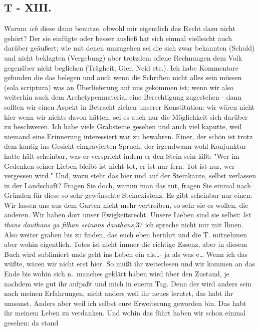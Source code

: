 \documentclass[
]{article}
\author{}
\date{\vspace{-2.5em}}
\begin{document}
\subsection{T - XIII.}\label{t---xiii.}

Warum \emph{ich} diese dann benutze, obwohl mir eigentlich das Recht
dazu nicht gehört? Der sie einfügte oder besser ausließ hat sich einmal
vielleicht auch darüber geäußert; wie mit denen umzugehen sei die sich
zwar bekannten (Schuld) und nicht beklagten (Vergebung) aber trotzdem
offene Rechnungen dem Volk gegenüber nicht beglichen (Trägheit, Gier,
Neid etc.). Ich habe Kommentare gefunden die das belegen und auch wenn
die Schriften nicht alles sein müssen (sola scriptura) was an
Überlieferung auf uns gekommen ist; wenn wir also weiterhin auch dem
Archetypenmaterial eine Berechtigung zugestehen - dann sollten wir einen
Aspekt in Betracht ziehen unserer Konstitution: wir wären nicht hier
wenn wir nichts davon hätten, sei es auch nur die Möglichkeit sich
darüber zu beschweren. Ich habe viele Grabsteine gesehen und auch viel
kaputte, weil niemand eine Erinnerung interessiert war zu bewahren.
Einer, der schön ist trotz dem kantig ins Gesicht eingravierten Spruch,
der irgendwann wohl Konjunktur hatte hält scheinbar, was er verspricht
indem er den Stein sein läßt: "Wer im Gedenken seiner Lieben bleibt ist
nicht tot, er ist nur fern. Tot ist nur, wer vergessen wird." Und, wozu
steht das hier und auf der Steinkante, selbst verlassen in der
Landschaft? Fragen Sie doch, warum man das tut, fragen Sie einmal nach
Gründen für diese so sehr gewünschte Steinexistenz. Es gibt scheinbar
nur einen: Wir lassen uns aus dem Garten nicht mehr vertreiben, so sehr
sie es wollen, die anderen. Wir haben dort unser Ewigkeitsrecht. Unsere
Lieben sind sie selbst: \emph{let thans dauthans ga filhan seinans
dauthans,}37 ich spreche nicht nur mit Ihnen. Also weiter graben bis zu
finden, das euch eben berührt und die T. mitnehmen aber wohin
eigentlich. Totes ist nicht immer die richtige Essenz, aber in diesem
Buch wird sublimiert unds geht ins Leben ein als\ldots- ja als was
e\ldots{} Wenn ich das wüßte, wären wir nicht erst hier. So müßt ihr
weiterlesen und wir kommen an das Ende bis wohin sich n.~manches geklärt
haben wird über den Zustand, je nachdem wie gut ihr aufpaßt und mich in
euerm Tag. Denn der wird anders sein nach meinen Erfahrungen, nicht
anders weil ihr neues lerntet, das habt ihr umsonst. Anders aber weil
ich selbst eure Erweiterung geworden bin. Das habt ihr meinem Leben zu
verdanken. Und wohin das führt haben wir schon einmal gesehen: da stand
\end{document}
